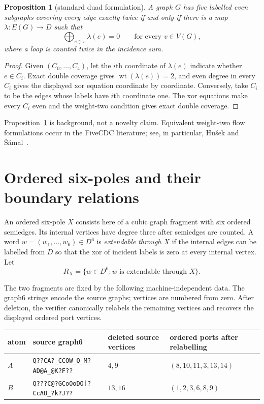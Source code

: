 \documentclass[11pt]{article}
\newtheorem{proposition}[theorem]{Proposition}
\theoremstyle{definition}
\newcommand{\wt}{\operatorname{wt}}
\begin{document}
\begin{proposition}[standard duad formulation]\label{prop:duad}
A graph $G$ has five labelled even subgraphs covering every edge exactly twice
if and only if there is a map $\lambda:E(G)\to D$ such that
\[
 \bigoplus_{e\ni v}\lambda(e)=0
 \qquad\text{for every }v\in V(G),
\]
where a loop is counted twice in the incidence sum.
\end{proposition}

\begin{proof}
Given $(C_0,\ldots,C_4)$, let the $i$th coordinate of $\lambda(e)$ indicate
whether $e\in C_i$.  Exact double coverage gives $\wt(\lambda(e))=2$, and
even degree in every $C_i$ gives the displayed xor equation coordinate by
coordinate.  Conversely, take $C_i$ to be the edges whose labels have
$i$th coordinate one.  The xor equations make every $C_i$ even and the
weight-two condition gives exact double coverage.
\end{proof}

Proposition~\ref{prop:duad} is background, not a novelty claim.  Equivalent
weight-two flow formulations occur in the FiveCDC literature; see, in
particular, Hu\v{s}ek and \v{S}\'amal~\cite{husek-samal-2026}.

\section{Ordered six-poles and their boundary relations}

An ordered six-pole $X$ consists here of a cubic graph fragment with six
ordered semiedges.  Its internal vertices have degree three after semiedges
are counted.  A word $w=(w_1,\ldots,w_6)\in D^6$ is \emph{extendable through
$X$} if the internal edges can be labelled from $D$ so that the xor of
incident labels is zero at every internal vertex.  Let
\[
 R_X=\{w\in D^6:w\text{ is extendable through }X\}.
\]

The two fragments are fixed by the following machine-independent data.  The
graph6 strings encode the source graphs; vertices are numbered from zero.
After deletion, the verifier canonically relabels the remaining vertices and
recovers the displayed ordered port vertices.

\begin{center}
\small
\begin{tabular}{@{}llll@{}}
\toprule
atom & source graph6 & deleted source vertices & ordered ports after relabelling\\
\midrule
$A$ & \texttt{Q??CA?\_CCOW\_Q\_M?AD@A\_@K?F??} & $4,9$ &
$(8,10,11,3,13,14)$\\
$B$ & \texttt{Q???C@?GCoOoDO[?CcAO\_?k?J??} & $13,16$ &
$(1,2,3,6,8,9)$\\
\bottomrule
\end{tabular}
\end{center}
\end{document}

